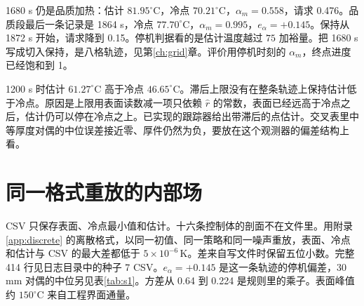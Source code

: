 1680 s 仍是品质加热：估计 \(81.95^\circ\mathrm{C}\)，冷点 \(70.21^\circ\mathrm{C}\)，\(\alpha_m=0.558\)，请求 0.476。品质段最后一条记录是 1864 s，冷点 \(77.70^\circ\mathrm{C}\)，\(\alpha_m=0.995\)，\(e_{\alpha}=+0.145\)。保持从 1872 s 开始，请求降到 0.15。停机判据看的是估计温度越过 \(75\) 加裕量。把 1680 s 写成切入保持，是八格轨迹，见第\ref{ch:grid}{}章。评价用停机时刻的 \(\alpha_m\)，终点进度已经饱和到 1。

1200 s 时估计 \(61.27^\circ\mathrm{C}\) 高于冷点 \(46.65^\circ\mathrm{C}\)。滞后上限没有在整条轨迹上保持估计低于冷点。原因是上限用表面读数减一项只依赖 \(\hat r\) 的常数，表面已经远高于冷点之后，估计仍可以停在冷点之上。已实现的跟踪器给出带滞后的点估计。交叉表里中等厚度对偶的中位误差接近零、厚件仍然为负，要放在这个观测器的偏差结构上看。

\section{同一格式重放的内部场}

CSV 只保存表面、冷点最小值和估计。十六条控制体的剖面不在文件里。用附录 \ref{app:discrete} 的离散格式，以同一初值、同一策略和同一噪声重放，表面、冷点和估计与 CSV 的最大差都低于 \(5\times 10^{-6}\,\mathrm{K}\)。差来自写文件时保留五位小数。完整 414 行见日志目录中的种子 7 CSV。\(e_{\alpha}=+0.145\) 是这一条轨迹的停机偏差，30 mm 对偶的中位另见表\ref{tab:s1}。方差从 0.64 到 0.224 是规则里的乘子。表面峰值约 \(150^\circ\mathrm{C}\) 来自工程界面通量。


